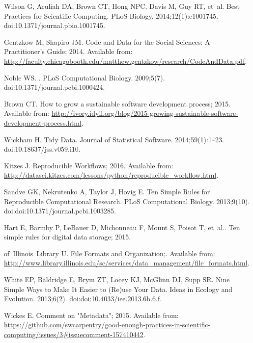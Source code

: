 \documentclass[10pt,letterpaper]{article}
\begin{document}
% 
\begin{thebibliography}{10}

Wilson G, Aruliah DA, Brown CT, Hong NPC, Davis M, Guy RT, et~al.
\newblock Best Practices for Scientific Computing.
\newblock PLoS Biology. 2014;12(1):e1001745.
\newblock doi:{10.1371/journal.pbio.1001745}.

Gentzkow M, Shapiro JM. Code and Data for the Social Sciences: A Practitioner's
  Guide; 2014.
\newblock Available from:
  \url{http://faculty.chicagobooth.edu/matthew.gentzkow/research/CodeAndData.pdf}.

Noble WS.
.
\newblock PLoS Computational Biology. 2009;5(7).
\newblock doi:{10.1371/journal.pcbi.1000424}.

Brown CT. How to grow a sustainable software development process; 2015.
\newblock Available from:
  \url{http://ivory.idyll.org/blog/2015-growing-sustainable-software-development-process.html}.

Wickham H.
\newblock Tidy Data.
\newblock Journal of Statistical Software. 2014;59(1):1--23.
\newblock doi:{10.18637/jss.v059.i10}.

Kitzes J. Reproducible Workflows; 2016.
\newblock Available from:
  \url{http://datasci.kitzes.com/lessons/python/reproducible\_workflow.html}.

Sandve GK, Nekrutenko A, Taylor J, Hovig E.
\newblock Ten Simple Rules for Reproducible Computational Research.
\newblock PLoS Computational Biology. 2013;9(10).
\newblock doi:{doi:10.1371/journal.pcbi.1003285}.

Hart E, Barmby P, LeBauer D, Michonneau F, Mount S, Poisot T, et~al.. Ten
  simple rules for digital data storage; 2015.

of~Illinois~Library U. File Formats and Organization;.
\newblock Available from:
  \url{http://www.library.illinois.edu/sc/services/data\_management/file\_formats.html}.

White EP, Baldridge E, Brym ZT, Locey KJ, McGlinn DJ, Supp SR.
\newblock Nine Simple Ways to Make It Easier to (Re)use Your Data.
\newblock Ideas in Ecology and Evolution. 2013;6(2).
\newblock doi:{doi:10.4033/iee.2013.6b.6.f}.

Wickes E. Comment on "Metadata"; 2015.
\newblock Available from:
  \url{https://github.com/swcarpentry/good-enough-practices-in-scientific-computing/issues/3\#issuecomment-157410442}.


\end{thebibliography}
\end{document}
